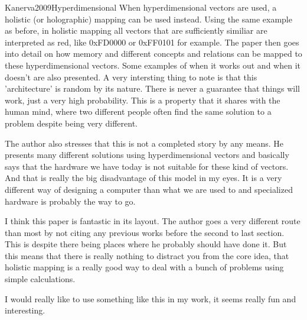 \documentclass[10pt]{article}
\begin{document}
\begin{review}{Kanerva2009Hyperdimensional}
    When hyperdimensional vectors are used, a holistic (or holographic) mapping can be used instead.
    Using the same example as before, in holistic mapping all vectors that are sufficiently similiar are interpreted as red, like 0xFD0000 or 0xFF0101 for example.
    The paper then goes into detail on how memory and different concepts and relations can be mapped to these hyperdimensional vectors.
    Some examples of when it works out and when it doesn't are also presented.
    A very intersting thing to note is that this 'architecture' is random by its nature.
    There is never a guarantee that things will work, just a very high probability.
    This is a property that it shares with the human mind, where two different people often find the same solution to a problem despite being very different.
    
    The author also stresses that this is not a completed story by any means.
    He presents many different solutions using hyperdimensional vectors and basically says that the hardware we have today is not suitable for these kind of vectors.
    And that is really the big disadvantage of this model in my eyes.
    It is a very different way of designing a computer than what we are used to and specialized hardware is probably the way to go.
    
    I think this paper is fantastic in its layout.
    The author goes a very different route than most by not citing any previous works before the second to last section.
    This is despite there being places where he probably should have done it.
    But this means that there is really nothing to distract you from the core idea, that holistic mapping is a really good way to deal with a bunch of problems using simple calculations.
    
    I would really like to use something like this in my work, it seems really fun and interesting.

\end{review}
\end{document}
